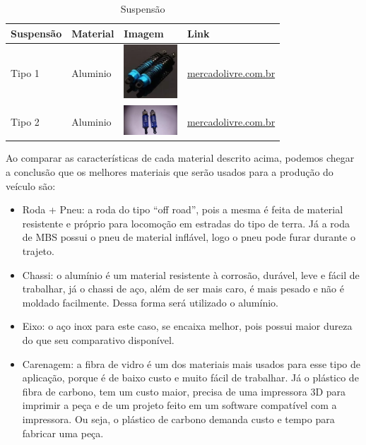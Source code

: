   \begin{table}[!htbp]
  \begin{center}
  \caption{Suspensão}
  \begin{tabular}{|p{3cm}|p{3cm}|p{2cm}|p{4cm}|}
  \hline
  \textbf{Suspensão} & \textbf{Material} & \textbf{Imagem} & \textbf{Link}\\\hline\hline
  Tipo 1 & Aluminio & \includegraphics[width=2cm]{figuras/suspensao_aluminio_1.jpg} & \href{http://produto.mercadolivre.com.br/MLB-689668697-par-amortecedor-aluminio-hsp-106004-06038-06062-rc-110-97mm-_JM}{mercadolivre.com.br}\\\hline
  Tipo 2 & Aluminio & \includegraphics[width=2cm]{figuras/suspensao_aluminio_2.jpg} & \href{http://produto.mercadolivre.com.br/MLB-722851070-par-de-amortecedor-75mm-para-automodelo-110-_JM}{mercadolivre.com.br}\\\hline
  \end{tabular}
  \end{center}
  \end{table}
  
  
  Ao comparar as características de cada material descrito acima, podemos chegar a conclusão que os melhores materiais que 
  serão usados para a produção do veículo são:
  
  \begin{itemize}
    \item Roda + Pneu: a roda do tipo “off road”, pois a mesma é feita de material resistente e próprio para locomoção em estradas do tipo de terra. Já a roda de MBS possui o pneu de material inflável, logo o pneu pode furar durante o trajeto.
    \item Chassi: o alumínio é um material resistente à corrosão, durável, leve e fácil de trabalhar, já o chassi de aço, além de ser mais caro, é mais pesado e não é moldado facilmente. Dessa forma será utilizado o alumínio.
    \item Eixo: o aço inox para este caso, se encaixa melhor, pois possui maior dureza do que seu comparativo disponível.
    \item Carenagem: a fibra de vidro é um dos materiais mais usados para esse tipo de aplicação, porque é de baixo custo e muito fácil de trabalhar. Já o plástico de fibra de carbono, tem um custo maior, precisa de uma impressora 3D para imprimir a peça e de um projeto feito em um software compatível com a  impressora. Ou seja, o plástico de carbono demanda custo e tempo para fabricar uma peça.
  \end{itemize}
  

